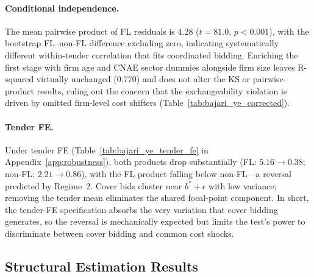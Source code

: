 \paragraph{Conditional independence.}
The mean pairwise product of FL residuals is 4.28 ($t = 81.0$,
$p < 0.001$), with the bootstrap FL--non-FL difference
excluding zero, indicating systematically different within-tender
correlation that fits coordinated bidding. Enriching the
first stage with firm age and CNAE sector dummies alongside firm
size leaves R-squared virtually unchanged (0.770) and does not
alter the KS or pairwise-product results, ruling out the concern
that the exchangeability violation is driven by omitted firm-level
cost shifters (Table~\ref{tab:bajari_ye_corrected}).

\paragraph{Tender FE.}
Under tender FE (Table~\ref{tab:bajari_ye_tender_fe} in
Appendix~\ref{app:robustness}), both products drop substantially
(FL: $5.16 \to 0.38$; non-FL: $2.21 \to 0.86$), with the FL product
falling below non-FL---a reversal predicted by Regime~2. Cover bids
cluster near $b^* + \epsilon$ with low variance; removing the tender
mean eliminates the shared focal-point component. In short, the tender-FE specification absorbs the very
variation that cover bidding generates, so the reversal is
mechanically expected but limits the test's power to discriminate
between cover bidding and common cost shocks.




\subsection{Structural Estimation Results}
\label{sec:results_structural}

